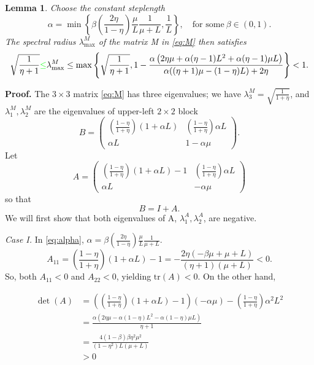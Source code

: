 \documentclass[11pt]{article}
\newtheorem{lem}[thm]{Lemma}
\begin{document}
\begin{lem} \label{lemma:spectral} 
 Choose the constant steplength
 \begin{equation}\label{eq:alpha}
    \alpha = \min\left\lbrace\beta\left(\frac{2 \eta}{1-\eta} \right)\frac{\mu}{L}\frac{1}{\mu+L},\frac{1}{L}\right\rbrace, \quad \mbox{for some} \ \beta  \in(0,1).
 \end{equation}
 The spectral radius $\lambda^M_{\max}$ of the matrix M in \eqref{eq:M} then satisfies
 \begin{equation}\label{eq:spectral}
  \sqrt{\frac{1}{\eta +1}}\textcolor{green}{\leq}\lambda^M_{\max} \leq \max\left\lbrace \sqrt{\frac{1}{\eta +1}}, 1-\frac{\alpha  \left(2 \eta  \mu +\alpha  (\eta -1) L^2+\alpha  (\eta -1) \mu  L\right)}{\alpha  ((\eta +1) \mu -  (1-\eta ) L)+2 \eta }\right\rbrace<1 . 
 \end{equation}
\end{lem}


\textbf{Proof.}  The $3\times 3$ matrix \eqref{eq:M} has three eigenvalues; we have $\lambda^M_3=\sqrt{\frac{1}{1+\eta}}$, and $\lambda^M_1,\lambda^M_2$ are the eigenvalues of upper-left $2\times 2$ block
\begin{equation}
 B = \begin{pmatrix} {\left(\frac{1-\eta}{1+\eta}\right)}(1+\alpha  L)  &    {\left(\frac{1-\eta}{1+\eta}\right)}\alpha L \\  
                   \alpha L  & 1-\alpha \mu \end{pmatrix}.                    
\end{equation} 
Let 
\[
A = \begin{pmatrix} {\left(\frac{1-\eta}{1+\eta}\right)}(1+\alpha  L)-1 & {\left(\frac{1-\eta}{1+\eta}\right)}\alpha L\\  
                   \alpha L  & -\alpha\mu \end{pmatrix}  
\]
so that
\[
 B = I + A.
\]
We will first show that both eigenvalues of A, $\lambda^A_1,\lambda^A_2$, are negative. 

\noindent
\textit{Case I.} In \eqref{eq:alpha}, $\alpha = \beta\left(\frac{2 \eta}{1-\eta} \right)\frac{\mu}{L}\frac{1}{\mu+L}$. 
\[
A_{11} = {\left(\frac{1-\eta}{1+\eta}\right)}(1+\alpha  L)-1 =-\frac{2 \eta  (-\beta  \mu +\mu +L)}{(\eta +1) (\mu +L)}< 0.
\]
So, both $A_{11}<0$ and $A_{22}<0$, yielding $\mbox{tr}(A)<0$.  On the other hand, 

\begin{align*}
	 \det(A) &=\left({\left(\frac{1-\eta}{1+\eta}\right)}(1+\alpha  L)-1\right)( -\alpha\mu ) -  {\left(\frac{1-\eta}{1+\eta}\right)}\alpha^2 L^2\\
	 &=\frac{\alpha  \left(2 \eta  \mu -\alpha  (1-\eta ) L^2-\alpha  (1-\eta ) \mu  L\right)}{\eta +1} \\
	         &= \frac{4 (1-\beta ) \beta  \eta ^2 \mu ^2}{\left(1-\eta ^2\right) L (\mu +L)}\\
	         &> 0
\end{align*}
\end{document}
